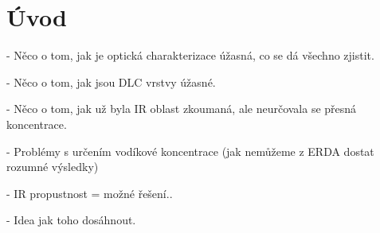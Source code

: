\chapter*{Úvod}

- Něco o tom, jak je optická charakterizace úžasná, co se dá všechno zjistit.

- Něco o tom, jak jsou DLC vrstvy úžasné.

- Něco o tom, jak už byla IR oblast zkoumaná, ale neurčovala se přesná koncentrace.

- Problémy s určením vodíkové koncentrace (jak nemůžeme z ERDA dostat rozumné výsledky)

- IR propustnost = možné řešení..

- Idea jak toho dosáhnout.

\cleardoublepage

